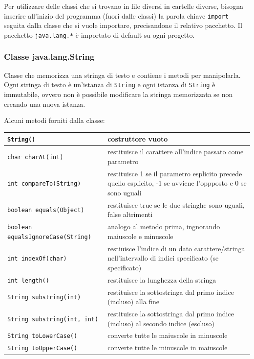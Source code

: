 \documentclass[a4paper]{article}
\begin{document}
Per utilizzare delle classi che si trovano in file diversi in cartelle diverse, bisogna inserire all'inizio del programma (fuori dalle classi)
la parola chiave \verb|import| seguita dalla classe che si vuole importare, precisandone il relativo pacchetto. Il pacchetto \verb|java.lang.*|
è importato di default su ogni progetto.

\newpage


\subsubsection*{Classe java.lang.String}
Classe che memorizza una stringa di testo e contiene i metodi per manipolarla. Ogni stringa di testo è un'istanza di \verb|String| e ogni istanza di
\verb|String| è immutabile, ovvero non è possibile modificare la stringa memorizzata se non creando una nuova istanza.

Alcuni metodi forniti dalla classe:
\begin{center}
	\begin{tabularx}{\textwidth}{l X}
		\toprule
		\verb|String()| & costruttore vuoto \\
		\midrule
		\verb|char charAt(int)| & restituisce il carattere all'indice passato come parametro \\
		\midrule
		\verb|int compareTo(String)| & restituisce 1 se il parametro esplicito precede quello esplicito, -1 se avviene l'oppposto e 0 se sono uguali \\
		\midrule
		\verb|boolean equals(Object)| & restituisce true se le due stringhe sono uguali, false altrimenti \\
		\midrule
		\verb|boolean equalsIgnoreCase(String)| & analogo al metodo prima, ingnorando maiuscole e minuscole \\
		\midrule
		\verb|int indexOf(char)| & restiuisce l'indice di un dato carattere/stringa nell'intervallo di indici specificato (se specificato) \\
		\midrule
		\verb|int length()| & restituisce la lunghezza della stringa \\
		\midrule
		\verb|String substring(int)| & restituisce la sottostringa dal primo indice (incluso) alla fine \\
		\midrule
		\verb|String substring(int, int)| & restituisce la sottostringa dal primo indice (incluso) al secondo indice (escluso) \\
		\midrule
		\verb|String toLowerCase()| & converte tutte le maiuscole in minuscole \\
		\midrule
		\verb|String toUpperCase()| & converte tutte le minuscole in maiuscole \\
		\bottomrule
	\end{tabularx}
\end{center}
\end{document}
